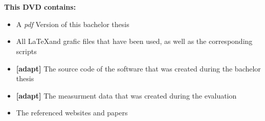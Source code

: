 \chapter*{}
\thispagestyle{empty}

\begin{center}
  \vspace{-3cm}
\end{center}

\vfill

\textbf{This DVD contains:}
\begin{itemize}
 \item A \emph{pdf} Version of this bachelor thesis
 \item All \LaTeX and grafic files that have been used, as well as the corresponding scripts
 \item \textbf{[adapt]} The source code of the software that was created during the bachelor thesis 
 \item \textbf{[adapt]} The measurment data that was created during the evaluation  
 \item The referenced websites and papers
\end{itemize}
